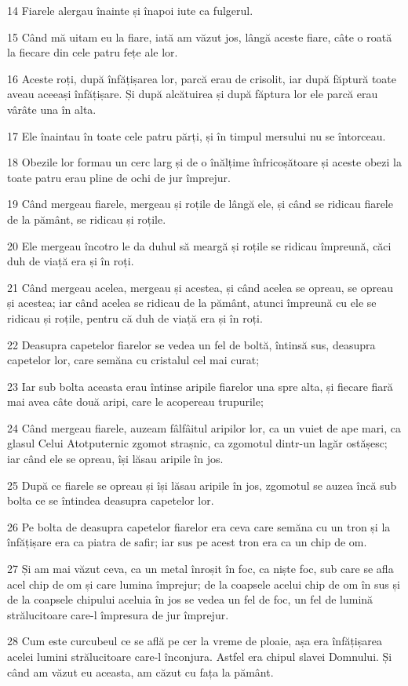 \par 14 Fiarele alergau înainte și înapoi iute ca fulgerul.
\par 15 Când mă uitam eu la fiare, iată am văzut jos, lângă aceste fiare, câte o roată la fiecare din cele patru fețe ale lor.
\par 16 Aceste roți, după înfățișarea lor, parcă erau de crisolit, iar după făptură toate aveau aceeași înfățișare. Și după alcătuirea și după făptura lor ele parcă erau vârâte una în alta.
\par 17 Ele înaintau în toate cele patru părți, și în timpul mersului nu se întorceau.
\par 18 Obezile lor formau un cerc larg și de o înălțime înfricoșătoare și aceste obezi la toate patru erau pline de ochi de jur împrejur.
\par 19 Când mergeau fiarele, mergeau și roțile de lângă ele, și când se ridicau fiarele de la pământ, se ridicau și roțile.
\par 20 Ele mergeau încotro le da duhul să meargă și roțile se ridicau împreună, căci duh de viață era și în roți.
\par 21 Când mergeau acelea, mergeau și acestea, și când acelea se opreau, se opreau și acestea; iar când acelea se ridicau de la pământ, atunci împreună cu ele se ridicau și roțile, pentru că duh de viață era și în roți.
\par 22 Deasupra capetelor fiarelor se vedea un fel de boltă, întinsă sus, deasupra capetelor lor, care semăna cu cristalul cel mai curat;
\par 23 Iar sub bolta aceasta erau întinse aripile fiarelor una spre alta, și fiecare fiară mai avea câte două aripi, care le acopereau trupurile;
\par 24 Când mergeau fiarele, auzeam fâlfâitul aripilor lor, ca un vuiet de ape mari, ca glasul Celui Atotputernic zgomot strașnic, ca zgomotul dintr-un lagăr ostășesc; iar când ele se opreau, își lăsau aripile în jos.
\par 25 După ce fiarele se opreau și își lăsau aripile în jos, zgomotul se auzea încă sub bolta ce se întindea deasupra capetelor lor.
\par 26 Pe bolta de deasupra capetelor fiarelor era ceva care semăna cu un tron și la înfățișare era ca piatra de safir; iar sus pe acest tron era ca un chip de om.
\par 27 Și am mai văzut ceva, ca un metal înroșit în foc, ca niște foc, sub care se afla acel chip de om și care lumina împrejur; de la coapsele acelui chip de om în sus și de la coapsele chipului aceluia în jos se vedea un fel de foc, un fel de lumină strălucitoare care-l împresura de jur împrejur.
\par 28 Cum este curcubeul ce se află pe cer la vreme de ploaie, așa era înfățișarea acelei lumini strălucitoare care-l înconjura. Astfel era chipul slavei Domnului. Și când am văzut eu aceasta, am căzut cu fața la pământ.

